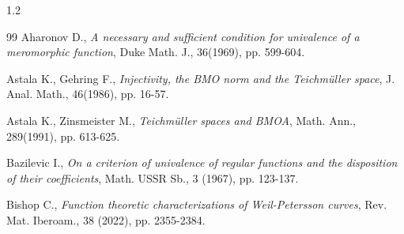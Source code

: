 \documentclass[10pt]{amsart}
\theoremstyle{definition}
\theoremstyle{remark}
\numberwithin{equation}{section}
\begin{document}
\begin{spacing}{1.2}
\begin{thebibliography}{99}
Aharonov D., {\em A necessary and sufficient condition for univalence of a meromorphic function}, Duke Math. J., 36(1969), pp. 599-604.

Astala K., Gehring F.,  {\em Injectivity, the BMO norm and the Teichm\"uller space}, J. Anal. Math.,  46(1986), pp. 16-57.

Astala K., Zinsmeister M.,  {\em Teichm\"uller spaces and BMOA}, Math. Ann., 289(1991), pp. 613-625.


Bazilevic I.,  {\em On a criterion of univalence of regular functions and the disposition of their coefficients}, Math. USSR Sb., 3 (1967), pp. 123-137.

Bishop C., {\em Function theoretic characterizations of Weil-Petersson curves}, Rev. Mat. Iberoam., 38 (2022), pp. 2355-2384.










\end{thebibliography}
\end{spacing}
\end{document}
